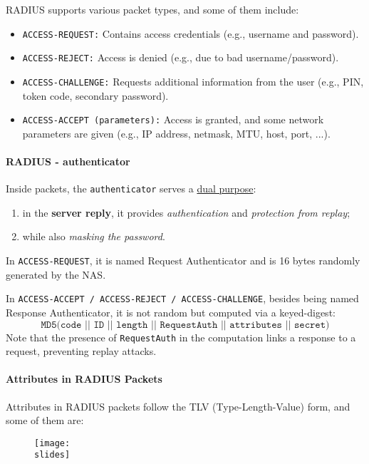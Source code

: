 \vspace*{7mm}    
RADIUS supports various packet types, and some of them include:

\begin{itemize}
    \item \texttt{ACCESS-REQUEST:} Contains access credentials (e.g., username and password).
    \item \texttt{ACCESS-REJECT:} Access is denied (e.g., due to bad username/password).
    \item \texttt{ACCESS-CHALLENGE:} Requests additional information from the user (e.g., PIN, token code, secondary password).
    \item \texttt{ACCESS-ACCEPT (parameters):} Access is granted, and some network parameters are given (e.g., IP address, netmask, MTU, host, port, ...).
\end{itemize}


\paragraph{RADIUS - authenticator}
Inside packets, the \texttt{authenticator} serves a \underline{dual purpose}: 
\begin{enumerate}
    \item in the \textbf{server reply}, it provides \textit{authentication} and \textit{protection from replay};
    \item while also \textit{masking the password}.
\end{enumerate}

In \texttt{ACCESS-REQUEST}, it is named Request Authenticator and is 16 bytes randomly generated by the NAS. 

In \texttt{ACCESS-ACCEPT / ACCESS-REJECT / ACCESS-CHALLENGE}, besides being named Response Authenticator, it is not random but computed via a keyed-digest:
\[
\texttt{MD5(code || ID || length || RequestAuth || attributes || secret)} 
\]
Note that the presence of \texttt{RequestAuth} in the computation links a response to a request, preventing replay attacks.



\paragraph{Attributes in RADIUS Packets}
Attributes in RADIUS packets follow the TLV (Type-Length-Value) form, and some of them are:

\begin{figure}[H]
    \centering
    \texttt{[image: \\slides]}
\end{figure}

